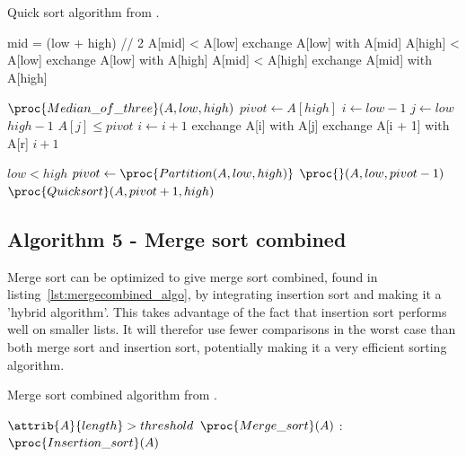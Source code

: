 \documentclass[sigconf, nonacm, natbib, screen, balance=False]{acmart}
\begin{document}
\begin{listing}
  \caption{Quick sort algorithm from \citet[Ch.~2.1]{CLRS_2009}.}
  \label{lst:quick_algo}
  
 \begin{codebox}
    \li mid = (low + high) // 2
    \li \If A[mid] < A[low]
    \li \Do
    exchange A[low] with A[mid]
    \End
    \li \If A[high] < A[low]
    \li \Do
    exchange A[low] with A[high]
    \End
    \li \If A[mid] < A[high]
    \li \Do
    exchange A[mid] with A[high]
  \end{codebox}

  \begin{codebox}
    \li $\proc{Median\_of\_three}(A, low, high)$
    \li $pivot \gets A[high]$
    \li $i \gets low - 1$
    \li \For $j \gets low $ \To $high -1$ 
    \li \Do
    \If $A[j] \leq pivot$
    \li \Do
    $i \gets i + 1$
    \li exchange A[i] with A[j]
    \End
    \End
    \li exchange A[i + 1] with A[r]
    \li \Return $i +1$
  \end{codebox}

  \begin{codebox}
    \li \If $low < high$
    \li \Do
    $pivot \gets \proc{Partition(A, low, high)}$
    \li $\proc{}(A, low, pivot-1)$
    \li $\proc{Quick sort}(A, pivot+1, high)$
  \end{codebox}

\end{listing}

\subsection{Algorithm 5 - Merge sort combined}\label{sec:algo5}

Merge sort can be optimized to give merge sort combined, found in listing~\ref{lst:mergecombined_algo}, by integrating insertion sort and making it a 'hybrid algorithm'. This takes advantage of the fact that insertion sort performs well on smaller lists. It will therefor use fewer comparisons in the worst case than both merge sort and insertion sort, potentially making it a very efficient sorting algorithm.  

\begin{listing}
  \caption{Merge sort combined algorithm from \citet[Ch.~2.1]{CLRS_2009}.}
  \label{lst:mergecombined_algo}
  
 \begin{codebox}
    \li \If $\attrib{A}{length} > threshold$
    \li \Do
    $\proc{Merge\_sort}(A)$
    \li \Else:
    \li $\proc{Insertion\_sort}(A)$
  \end{codebox}
\end{listing}
\end{document}
